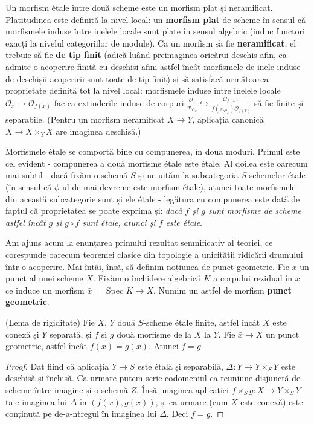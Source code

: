 \documentclass[13pt,openany]{book}
\begin{document}
Un morfism étale între două scheme este un morfism plat și neramificat. Platitudinea este definită la nivel local: un {\bf morfism plat} de scheme în sensul că morfismele induse între inelele locale sunt plate în sensul algebric (induc functori exacți la nivelul categoriilor de module). Ca un morfism să fie {\bf neramificat}, el trebuie să fie {\bf de tip finit} (adică luând preimaginea oricărui deschis afin, ea admite o acoperire finită cu deschiși afini astfel încât morfismele de inele induse de deschișii acoperirii sunt toate de tip finit) și să satisfacă următoarea proprietate definită tot la nivel local: morfismele induse între inelele locale $\mathcal{O}_x \rightarrow \mathcal{O}_{f(x)}$ fac ca extinderile induse de corpuri $\frac{\mathcal{O}_x}{\mathfrak{m}_{\mathcal{O}_x}} \hookrightarrow \frac{\mathcal{O}_{f(x)}}{f(\mathfrak{m}_{\mathcal{O}_x})\mathcal{O}_{f(x)}}$ să fie finite și separabile. (Pentru un morfism neramificat $X \rightarrow Y$, aplicația canonică $X \rightarrow X\times_Y X$ are imaginea deschisă.)

Morfismele étale se comportă bine cu compunerea, în două moduri. Primul este cel evident - compunerea a două morfisme étale este étale. Al doilea este oarecum mai subtil - dacă fixăm o schemă $S$ și ne uităm la subcategoria $S$-schemelor étale (în sensul că $\phi$-ul de mai devreme este morfism étale), atunci toate morfismele din această subcategorie sunt și ele étale - legătura cu compunerea este dată de faptul că proprietatea se poate exprima și: {\it dacă $f$ și $g$ sunt morfisme de scheme astfel încât $g$ și $g \circ f$ sunt étale, atunci și $f$ este étale}.

Am ajuns acum la enunțarea primului rezultat semnificativ al teoriei, ce corespunde oarecum teoremei clasice din topologie a unicității ridicării drumului într-o acoperire. Mai întâi, însă, să definim noțiunea de punct geometric. Fie $x$ un punct al unei scheme $X$. Fixăm o închidere algebrică $K$ a corpului rezidual în $x$ ce induce un morfism $\bar{x}=$ Spec $K\rightarrow X$. Numim un astfel de morfism {\bf punct geometric}.

\begin{lema}
(Lema de rigiditate) Fie $X$, $Y$ două $S$-scheme étale finite, astfel încât $X$ este conexă și $Y$ separată, și $f$ și $g$ două morfisme de la $X$ la $Y$. Fie $\bar{x} \rightarrow X$ un punct geometric, astfel încât $f(\bar{x})=g(\bar{x})$. Atunci $f=g$.
\end{lema}

\begin{proof}
Dat fiind că aplicația $Y \rightarrow S$ este étală și separabilă, $\Delta : Y \rightarrow Y \times_S Y$ este deschisă și închisă. Ca urmare putem scrie codomeniul ca reuniune disjunctă de scheme între imagine și o schemă $Z$. Însă imaginea aplicației $f \times_S g: X \rightarrow Y \times_S Y$ taie imaginea lui $\Delta$ în $(f(\bar{x}),g(\bar{x}))$, și ca urmare (cum $X$ este conexă) este conținută pe de-a-ntregul în imaginea lui $\Delta$. Deci $f=g$.
\end{proof}
\end{document}

